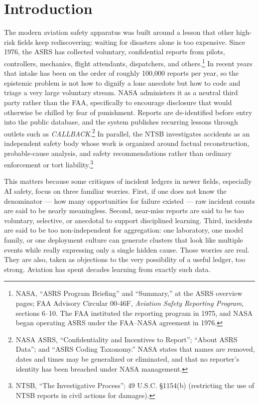 \documentclass[11pt]{article}
\begin{document}
\section{Introduction}
The modern aviation safety apparatus was built around a lesson that other high-risk fields keep rediscovering: waiting for disasters alone is too expensive. Since 1976, the ASRS has collected voluntary, confidential reports from pilots, controllers, mechanics, flight attendants, dispatchers, and others.\footnote{NASA, ``ASRS Program Briefing'' and ``Summary,'' at the ASRS overview pages; FAA Advisory Circular 00-46F, \textit{Aviation Safety Reporting Program}, sections 6--10. The FAA instituted the reporting program in 1975, and NASA began operating ASRS under the FAA--NASA agreement in 1976.} In recent years that intake has been on the order of roughly 100,000 reports per year, so the epistemic problem is not how to dignify a lone anecdote but how to code and triage a very large voluntary stream. NASA administers it as a neutral third party rather than the FAA, specifically to encourage disclosure that would otherwise be chilled by fear of punishment. Reports are de-identified before entry into the public database, and the system publishes recurring lessons through outlets such as \textit{CALLBACK}.\footnote{NASA ASRS, ``Confidentiality and Incentives to Report''; ``About ASRS Data''; and ``ASRS Coding Taxonomy.'' NASA states that names are removed, dates and times may be generalized or eliminated, and that no reporter's identity has been breached under NASA management.} In parallel, the NTSB investigates accidents as an independent safety body whose work is organized around factual reconstruction, probable-cause analysis, and safety recommendations rather than ordinary enforcement or tort liability.\footnote{NTSB, ``The Investigative Process''; 49 U.S.C. \S 1154(b) (restricting the use of NTSB reports in civil actions for damages).}

This matters because some critiques of incident ledgers in newer fields, especially AI safety, focus on three familiar worries. First, if one does not know the denominator --- how many opportunities for failure existed --- raw incident counts are said to be nearly meaningless. Second, near-miss reports are said to be too voluntary, selective, or anecdotal to support disciplined learning. Third, incidents are said to be too non-independent for aggregation: one laboratory, one model family, or one deployment culture can generate clusters that look like multiple events while really expressing only a single hidden cause. Those worries are real. They are also, taken as objections to the very possibility of a useful ledger, too strong. Aviation has spent decades learning from exactly such data.
\end{document}
